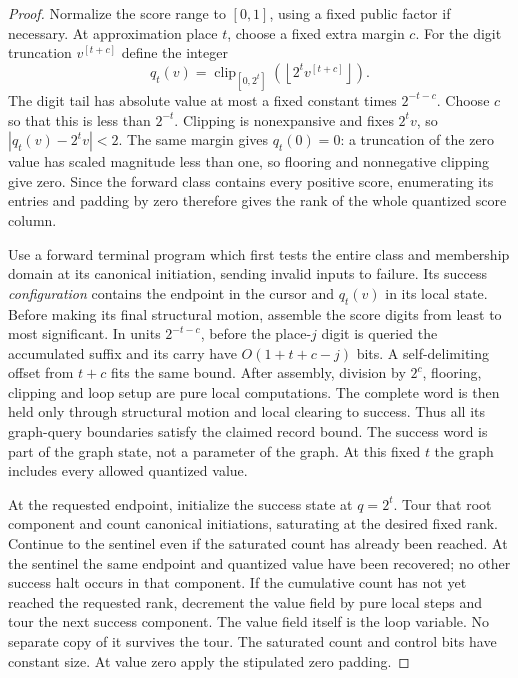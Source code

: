 \begin{proof}
Normalize the score range to $[0,1]$, using a fixed public factor if
necessary.  At approximation place $t$, choose a fixed extra margin $c$.
For the digit truncation $v^{[t+c]}$ define the integer
\begin{equation}\label{eq:ctrl-score-quantization}
 q_t(v)=\operatorname{clip}_{[0,2^t]}
             \left(\left\lfloor 2^t v^{[t+c]}\right\rfloor\right).
\end{equation}
The digit tail has absolute value at most a fixed constant times
$2^{-t-c}$.  Choose $c$ so that this is less than $2^{-t}$.
Clipping is nonexpansive and fixes $2^t v$, so
$|q_t(v)-2^t v|<2$.  The same margin gives $q_t(0)=0$:
a truncation of the zero value has scaled magnitude less than one, so
flooring and nonnegative clipping give zero.  Since the forward class
contains every positive score, enumerating its entries and padding by
zero therefore gives the rank of the whole quantized score column.

Use a forward terminal program which first tests the entire class and
membership domain at its canonical initiation, sending invalid inputs
to failure.  Its success \emph{configuration} contains the endpoint in
the cursor and $q_t(v)$ in its local state.  Before making its final
structural motion, assemble the score digits from least to most
significant.  In units $2^{-t-c}$, before the place-$j$ digit is queried
the accumulated suffix and its carry have $O(1+t+c-j)$ bits.  A
self-delimiting offset from $t+c$ fits the same bound.  After assembly,
division by $2^c$, flooring, clipping and loop setup are pure local computations.  The
complete word is then held only through structural motion and local
clearing to success.  Thus all its graph-query boundaries satisfy the
claimed record bound.  The success word is part of the graph state, not
a parameter of the graph.  At this fixed $t$ the graph includes every
allowed quantized value.

At the requested endpoint, initialize the success state at $q=2^t$.
Tour that root component and count canonical
initiations, saturating at the desired fixed rank.  Continue to the
sentinel even if the saturated count has already been reached.  At the
sentinel the same endpoint and quantized value have been recovered; no
other success halt occurs in that component.  If the cumulative count
has not yet reached the requested rank, decrement the value field by
pure local steps and tour the next success component.  The value field
itself is the loop variable.  No separate copy of it survives the tour.
The saturated count and control bits have constant size.  At value zero
apply the stipulated zero padding.


\end{proof}
